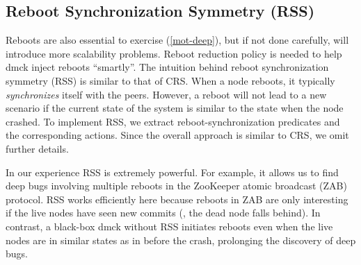



\subsection{Reboot Synchronization Symmetry (RSS)}
\label{sam-rss}


Reboots are also essential to exercise (\sec\ref{mot-deep}), but if not
done carefully, will introduce more scalability problems.  Reboot reduction
policy is needed to help dmck inject reboots ``smartly''.  The intuition
behind reboot synchronization symmetry (RSS) is similar to that of CRS.
When a node reboots, it typically {\em synchronizes} itself with the peers.
However, a reboot will not lead to a new scenario if the current state of
the system is similar to the state when the node crashed.  To implement
RSS, we extract reboot-synchronization predicates and the corresponding
actions.  Since the overall approach is similar to CRS, we omit further
details.


In our experience RSS is extremely powerful.  For example, it allows
us to find deep bugs involving multiple reboots in the ZooKeeper
atomic broadcast (ZAB) protocol.  RSS works efficiently here because
reboots in ZAB are only interesting if the live nodes have seen new
commits (\ie, the dead node falls behind).  In contrast, a black-box
dmck without RSS initiates reboots even when the live nodes are in
similar states as in before the crash, prolonging the discovery of
deep bugs.


